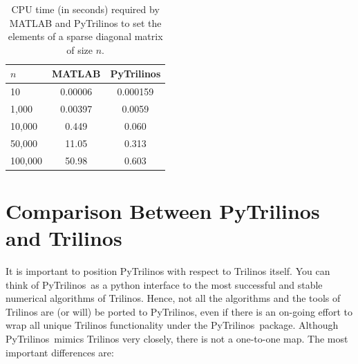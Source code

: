 \documentclass[acmtocl]{acmtrans2m}
\newcommand{\PyTrilinos}{{PyTrilinos}}
\begin{document}
\begin{table}
  \begin{center}
    \begin{tabular}{| l | c | c |}
      \hline
      $n$ & MATLAB & PyTrilinos \\
      \hline
      \hline
      10      & 0.00006 & 0.000159 \\
      1,000   & 0.00397 & 0.0059   \\
      10,000  & 0.449   & 0.060    \\
      50,000  & 11.05   & 0.313    \\
      100,000 & 50.98   & 0.603    \\
      \hline
    \end{tabular}
    \caption{CPU time (in seconds) required by MATLAB and PyTrilinos
      to set the elements of a sparse diagonal matrix of size $n$.}
    \label{tab:matlab_sparse}
  \end{center}
\end{table}

\section{Comparison Between PyTrilinos and Trilinos}
\label{sec:comparison_trilinos}

It is important to position PyTrilinos with respect to Trilinos
itself. You can think of \PyTrilinos\ as a python interface to the
most successful and stable numerical algorithms of Trilinos.  Hence,
not all the algorithms and the tools of Trilinos are (or will) be
ported to \PyTrilinos, even if there is an on-going effort to wrap all
unique Trilinos functionality under the \PyTrilinos\ package.
Although \PyTrilinos\ mimics Trilinos very closely, there is not a
one-to-one map. The most important differences are:
\end{document}
